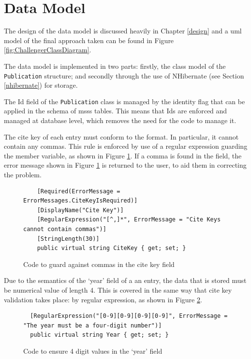 \section{Data Model}
\label{dataModel}
The design of the data model is discussed heavily in Chapter \ref{design} and a \gls{uml} model of the final approach taken can be found in Figure \ref{fig:ChallengerClassDiagram}.

The data model is implemented in two parts: firstly, the class model of the \texttt{Publication} structure; and secondly through the use of NHibernate (see Section \ref{nhibernate}) for storage.

\revisit\revisit\revisit\revisit\revisit
The Id field of the \texttt{Publication} class is managed by the identity flag that can be applied in the schema of \gls{msss} tables.  This means that Ids are enforced and managed at database level, which removes the need for the code to manage it.

The cite key of each entry must conform to the \bibtex{} format.  In particular, it cannot contain any commas.  This rule is enforced by use of a regular expression guarding the member variable, as shown in Figure \ref{fig:ckGuard}.  If a comma is found in the field, the error message shown in Figure \ref{fig:ckGuard} is returned to the user, to aid them in correcting the problem.

\begin{figure}
	\begin{center}
			\lstset{language=CSharp} 
			\begin{lstlisting}
	[Required(ErrorMessage = ErrorMessages.CiteKeyIsRequired)]
	[DisplayName("Cite Key")]
	[RegularExpression("[^,]*", ErrorMessage = "Cite Keys cannot contain commas")]
	[StringLength(30)]
	public virtual string CiteKey { get; set; }
			\end{lstlisting}
		\caption{Code to guard against commas in the cite key field}
		\label{fig:ckGuard}
	\end{center}
\end{figure}

Due to the semantics of the `year' field of a an entry, the data that is stored must be numerical value of length 4.  This is covered in the same way that cite key validation takes place: by regular expression, as shown in Figure \ref{fig:yearGuard}.

\begin{figure}
	\begin{center}
			\lstset{language=CSharp} 
			\begin{lstlisting}
  [RegularExpression("[0-9][0-9][0-9][0-9]", ErrorMessage = "The year must be a four-digit number")]
  public virtual string Year { get; set; }
			\end{lstlisting}
		\caption{Code to ensure 4 digit values in the `year' field}
		\label{fig:yearGuard}
	\end{center}
\end{figure}



